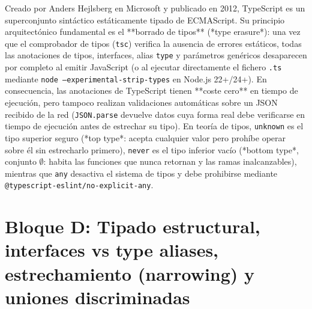 \documentclass{book}
\begin{document}
Creado por Anders Hejlsberg en Microsoft y publicado en 2012, TypeScript es un superconjunto sintáctico estáticamente tipado de ECMAScript. Su principio arquitectónico fundamental es el **borrado de tipos** (*type erasure*): una vez que el comprobador de tipos (\texttt{tsc}) verifica la ausencia de errores estáticos, todas las anotaciones de tipos, interfaces, alias \texttt{type} y parámetros genéricos desaparecen por completo al emitir JavaScript (o al ejecutar directamente el fichero \texttt{.ts} mediante \texttt{node --experimental-strip-types} en Node.js 22+/24+). En consecuencia, las anotaciones de TypeScript tienen **coste cero** en tiempo de ejecución, pero tampoco realizan validaciones automáticas sobre un JSON recibido de la red (\texttt{JSON.parse} devuelve datos cuya forma real debe verificarse en tiempo de ejecución antes de estrechar su tipo). En teoría de tipos, \texttt{unknown} es el tipo superior seguro (*top type*: acepta cualquier valor pero prohíbe operar sobre él sin estrecharlo primero), \texttt{never} es el tipo inferior vacío (*bottom type*, conjunto \(\emptyset\): habita las funciones que nunca retornan y las ramas inalcanzables), mientras que \texttt{any} desactiva el sistema de tipos y debe prohibirse mediante \texttt{@typescript-eslint/no-explicit-any}.

\section{Bloque D: Tipado estructural, interfaces vs type aliases, estrechamiento (narrowing) y uniones discriminadas}
\end{document}
